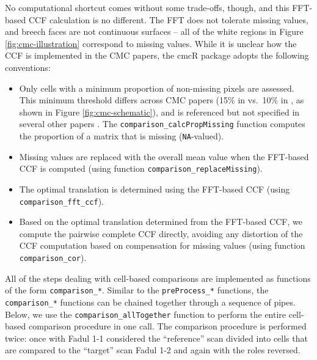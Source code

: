 \documentclass[11pt,]{isuthesis}
\begin{document}
No computational shortcut comes without some trade-offs, though, and this FFT-based CCF calculation is no different.
The FFT does not tolerate missing values, and breech faces are not continuous surfaces -- all of the white regions in Figure \ref{fig:cmc-illustration} correspond to missing values.
While it is unclear how the CCF is implemented in the CMC papers, the cmcR package adopts the following conventions:

\begin{itemize}
\item
  Only cells with a minimum proportion of non-missing pixels are assessed. This minimum threshold differs across CMC papers (15\% in \citet{chen_convergence_2017} vs.~10\% in \citet{song_estimating_2018}, as shown in Figure \ref{fig:cmc-schematic}), and is referenced but not specified in several other papers \citep{tong_fired_2014, song_3d_2014, chu_validation_2013}. The \texttt{comparison\_calcPropMissing} function computes the proportion of a matrix that is missing (\texttt{NA}-valued).
\item
  Missing values are replaced with the overall mean value when the FFT-based CCF is computed (using function \texttt{comparison\_replaceMissing}).
\item
  The optimal translation is determined using the FFT-based CCF (using \texttt{comparison\_fft\_ccf}).
\item
  Based on the optimal translation determined from the FFT-based CCF, we compute the pairwise complete CCF directly, avoiding any distortion of the CCF computation based on compensation for missing values (using function \texttt{comparison\_cor}).
\end{itemize}

All of the steps dealing with cell-based comparisons are implemented as functions of the form \texttt{comparison\_*}.
Similar to the \texttt{preProcess\_*} functions, the \texttt{comparison\_*} functions can be chained together through a sequence of pipes.
Below, we use the \texttt{comparison\_allTogether} function to perform the entire cell-based comparison procedure in one call.
The comparison procedure is performed twice: once with Fadul 1-1 considered the ``reference'' scan divided into cells that are compared to the ``target'' scan Fadul 1-2 and again with the roles reversed.
\end{document}
